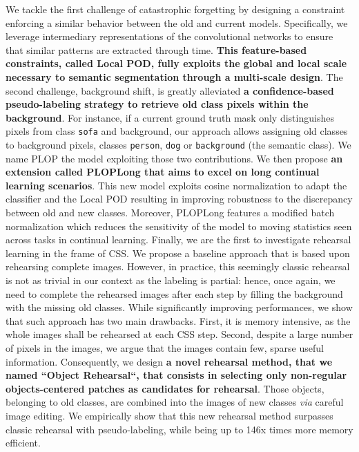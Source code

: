 We tackle the first challenge of catastrophic forgetting by designing a constraint enforcing a
similar behavior between the old and current models. Specifically, we leverage intermediary
representations of the convolutional networks to ensure that similar patterns are extracted through
time. \textbf{This feature-based constraints, called Local POD, fully exploits the global and local
    scale necessary to semantic segmentation through a multi-scale design}. The second challenge,
background shift, is greatly alleviated \textbf{a confidence-based pseudo-labeling strategy to
    retrieve old class pixels within the background}. For instance, if a current ground truth mask only
distinguishes pixels from class \texttt{sofa} and background, our approach allows assigning old
classes to background pixels, \eg classes \texttt{person}, \texttt{dog} or \texttt{background} (the
semantic class). We name PLOP the model exploiting those two contributions. We then propose
\textbf{an extension called PLOPLong that aims to excel on long continual learning scenarios}. This
new model exploits cosine normalization to adapt the classifier and the Local POD resulting in
improving robustness to the discrepancy between old and new classes. Moreover, PLOPLong features a
modified batch normalization which reduces the sensitivity of the model to moving statistics seen
across tasks in continual learning. Finally, we are the first to investigate rehearsal learning in
the frame of \ac{CSS}. We propose a baseline approach that is based upon rehearsing complete images.
However, in practice, this seemingly classic rehearsal is not as trivial in our context as the
labeling is partial: hence, once again, we need to complete the rehearsed images after each step by
filling the background with the missing old classes. While significantly improving performances, we
show that such approach has two main drawbacks. First, it is memory intensive, as the whole images
shall be rehearsed at each \ac{CSS} step. Second, despite a large number of pixels in the images, we
argue that the images contain few, sparse useful information. Consequently, we design \textbf{a
    novel rehearsal method, that we named ``Object Rehearsal``, that consists in selecting only
    non-regular objects-centered patches as candidates for rehearsal}. Those objects, belonging to old
classes, are combined into the images of new classes \textit{via} careful image editing. We
empirically show that this new rehearsal method surpasses classic rehearsal with pseudo-labeling,
while being up to 146x times more memory efficient.

